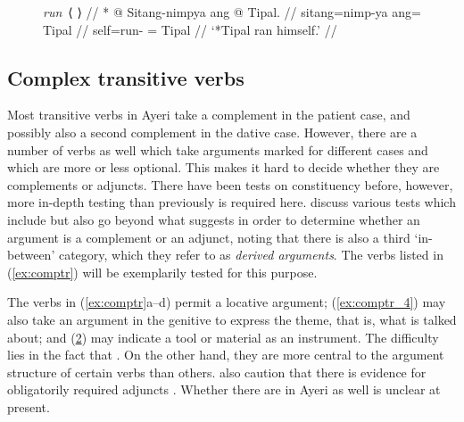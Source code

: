 \begin{figure}
\ex\label{ex:runtranswrong}\begingl
	\glpreamble *\emph{run}~⟨\ups{\Subj} \ups{\Obj}⟩ //
	\gla \textup{*} @ Sitang-nimpya ang @ Tipal. //
	\glb {} sitang=nimp-ya ang= Tipal //
	\glc {} self=run-\TsgM{} \Aarg{}= Tipal //
	\glft \hphantom{*}`*Tipal ran himself.' //
\endgl\xe
\end{figure}


\subsection{Complex transitive verbs}
\label{subsec:comptr}

Most transitive verbs in Ayeri take a complement in the patient case, and
possibly also a second complement in the dative case. However, there are a
number of verbs as well which take arguments marked for different cases and
which are more or less optional. This makes it hard to decide whether they are
complements or adjuncts. There have been tests on constituency before, however,
more in-depth testing than previously is required here.
\citet{needhamtoivonen2011} discuss various tests which include but also go
beyond what \citet{carnie2013} suggests in order to determine whether an
argument is a complement or an adjunct, noting that there is also a third
`in-between' category, which they refer to as \emph{derived arguments}. The
verbs listed in (\ref{ex:comptr}) will be exemplarily tested for this purpose.

\begin{figure}
\pex\label{ex:comptr}
\a\label{ex:comptr_1}%
\a\label{ex:comptr_2}%
\a\label{ex:comptr_3}%
\a\label{ex:comptr_4}%
\a\label{ex:comptr_5}%
\xe
\end{figure}

The verbs in (\ref{ex:comptr}a--d) permit a locative argument;
(\ref{ex:comptr_4}) may also take an argument in the genitive to express the
theme, that is, what is talked about; and (\ref{ex:comptr_5}) may indicate a
tool or material as an instrument. The difficulty lies in the fact that
. On the other hand, they are more central to the argument structure of
certain verbs than others. \citet{needhamtoivonen2011} also caution that there
is evidence for obligatorily required adjuncts
\citep[406]{needhamtoivonen2011}. Whether there are in Ayeri as well is unclear
at present.

